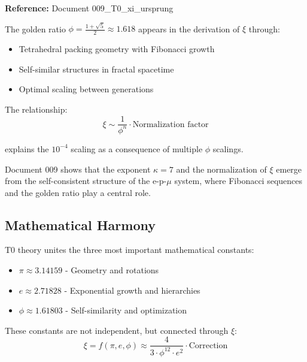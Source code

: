 	\begin{tcolorbox}[colback=magenta!5!white,colframe=magenta!75!black,title={Geometric Derivation of $\xi$}]
		\textbf{Reference:} Document 009\_T0\_xi\_ursprung
		
		The golden ratio $\phi = \frac{1+\sqrt{5}}{2} \approx 1.618$ appears in the derivation of $\xi$ through:
		
		\begin{itemize}
			\item Tetrahedral packing geometry with Fibonacci growth
			\item Self-similar structures in fractal spacetime
			\item Optimal scaling between generations
		\end{itemize}
		
		The relationship:
		\begin{equation}
			\xi \sim \frac{1}{\phi^n} \cdot \text{Normalization factor}
		\end{equation}
		
		explains the $10^{-4}$ scaling as a consequence of multiple $\phi$ scalings.
		
		Document 009 shows that the exponent $\kappa = 7$ and the normalization of $\xi$ emerge from the self-consistent structure of the e-p-$\mu$ system, where Fibonacci sequences and the golden ratio play a central role.
	\end{tcolorbox}
	
	\subsection{Mathematical Harmony}
	
	T0 theory unites the three most important mathematical constants:
	
	\begin{itemize}
		\item $\pi \approx 3.14159$ - Geometry and rotations
		\item $e \approx 2.71828$ - Exponential growth and hierarchies
		\item $\phi \approx 1.61803$ - Self-similarity and optimization
	\end{itemize}
	
	These constants are not independent, but connected through $\xi$:
	\begin{equation}
		\xi = f(\pi, e, \phi) \approx \frac{4}{3 \cdot \phi^{12} \cdot e^2} \cdot \text{Correction}
	\end{equation}
	
